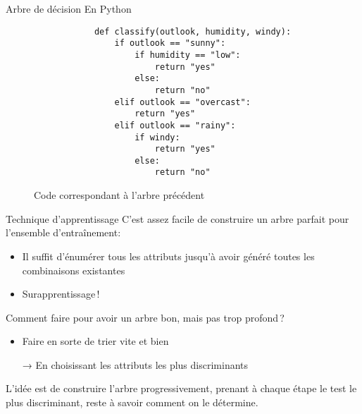 \documentclass[xcolor={svgnames}, french]{beamer}
\newcommand{\itpause}{%
	\addtocounter{beamerpauses}{-1}%
	\pause %
}
\begin{document}
\begin{frame}[fragile]{Arbre de décision}
    En Python
    \begin{figure}
        \begin{verbatim}
            def classify(outlook, humidity, windy):
                if outlook == "sunny":
                    if humidity == "low":
                        return "yes"
                    else:
                        return "no"
                elif outlook == "overcast":
                    return "yes"
                elif outlook == "rainy":
                    if windy:
                        return "yes"
                    else:
                        return "no"
        \end{verbatim}
        \caption{Code correspondant à l'arbre précédent}
    \end{figure}
\end{frame}

\begin{frame}{Technique d'apprentissage}
    C'est assez facile de construire un arbre parfait pour l'ensemble d'entraînement:

    \begin{itemize}
        \item<+-> Il suffit d'énumérer tous les attributs jusqu'à avoir généré toutes les combinaisons existantes
        \item<+->[→] Surapprentissage ! %
    \end{itemize}
	\itpause
    Comment faire pour avoir un arbre bon, mais pas trop profond ?
    \pause
    \begin{itemize}
        \item Faire en sorte de trier vite et bien
        \item[→] En choisissant les attributs les plus discriminants
    \end{itemize}
    L'idée est de construire l'arbre progressivement, prenant à chaque étape le test le plus \alert{discriminant}, reste à savoir comment on le détermine.
\end{frame}
\end{document}
